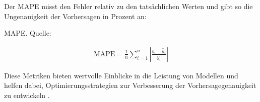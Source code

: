 Der MAPE misst den Fehler relativ zu den tatsächlichen Werten und gibt so die Ungenauigkeit der Vorhersagen in Prozent an:

\begin{formel}[h]
	\caption{\ac{MAPE}. Quelle: \autocite{makridakis1993accuracy}}
	\label{frm:MAPE}
	\begin{align}
	\text{MAPE} = \frac{1}{n} \sum_{i=1}^{n} \left| \frac{y_i - \hat{y}_i}{y_i} \right|
	\end{align}
\end{formel}

Diese Metriken bieten wertvolle Einblicke in die Leistung von Modellen und helfen dabei, Optimierungsstrategien zur Verbesserung der Vorhersagegenauigkeit zu entwickeln \autocite{davydenko2009mean}\autocite{hyndman2006another}\autocite{makridakis1993accuracy}.





